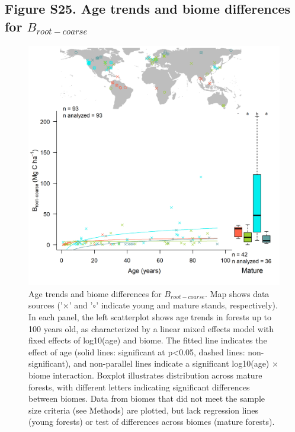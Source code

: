 \documentclass[
]{article}
\begin{document}
\newpage

\hypertarget{figure-s25.-age-trends-and-biome-differences-for-b_root-coarse}{%
\subsection{\texorpdfstring{Figure S25. Age trends and biome differences
for
\(B_{root-coarse}\)}{Figure S25. Age trends and biome differences for B\_\{root-coarse\}}}\label{figure-s25.-age-trends-and-biome-differences-for-b_root-coarse}}

\begin{figure}[H]

{\centering \includegraphics[width=1\linewidth]{tables_figures/age_trends/biomass_root_coarse_with_map} 

}

\caption{Age trends and biome differences for $B_{root-coarse}$. Map shows data sources ('$\times$' and '$\circ$' indicate young and mature stands, respectively). In each panel, the left scatterplot shows age trends in forests up to 100 years old, as characterized by a linear mixed effects model with fixed effects of log10(age) and biome. The fitted line indicates the effect of age (solid lines: significant at p<0.05, dashed lines: non-significant), and non-parallel lines indicate a significant log10(age) $\times$ biome interaction. Boxplot illustrates distribution across mature forests, with different letters indicating significant differences between biomes. Data from biomes that did not meet the sample size criteria (see Methods) are plotted, but lack regression lines (young forests) or test of differences across biomes (mature forests).}\label{fig:unnamed-chunk-28}
\end{figure}
\end{document}
